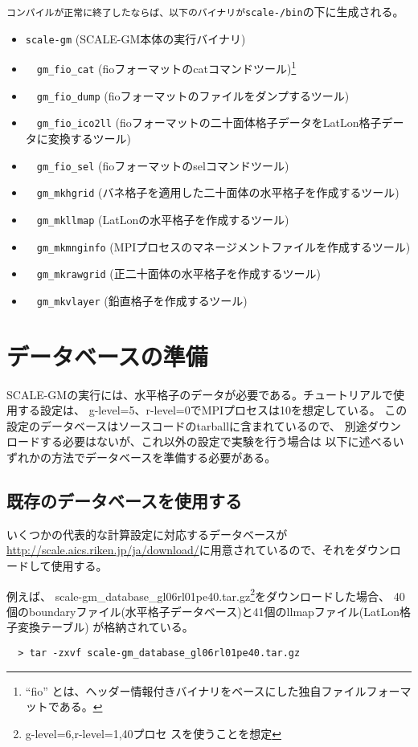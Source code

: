 \verb|コンパイルが正常に終了したならば、以下のバイナリが|\texttt{scale-{\version}/bin}の下に生成される。
 \begin{itemize}
   \item \verb|scale-gm| (SCALE-GM本体の実行バイナリ)
   \item　\verb|gm_fio_cat| (fioフォーマットのcatコマンドツール)\footnote{``fio'' とは、ヘッダー情報付きバイナリをベースにした独自ファイルフォーマットである。}
   \item　\verb|gm_fio_dump| (fioフォーマットのファイルをダンプするツール)
   \item　\verb|gm_fio_ico2ll| (fioフォーマットの二十面体格子データをLatLon格子データに変換するツール)
   \item　\verb|gm_fio_sel| (fioフォーマットのselコマンドツール)
   \item　\verb|gm_mkhgrid| (バネ格子を適用した二十面体の水平格子を作成するツール)
   \item　\verb|gm_mkllmap| (LatLonの水平格子を作成するツール)
   \item　\verb|gm_mkmnginfo| (MPIプロセスのマネージメントファイルを作成するツール)
   \item　\verb|gm_mkrawgrid| (正二十面体の水平格子を作成するツール)
   \item　\verb|gm_mkvlayer| (鉛直格子を作成するツール)
 \end{itemize}


\section{データベースの準備}

SCALE-GMの実行には、水平格子のデータが必要である。チュートリアルで使用する設定は、
g-level=5、r-level=0でMPIプロセスは10を想定している。
この設定のデータベースはソースコードのtarballに含まれているので、
別途ダウンロードする必要はないが、これ以外の設定で実験を行う場合は
以下に述べるいずれかの方法でデータベースを準備する必要がある。
\subsection{既存のデータベースを使用する}
いくつかの代表的な計算設定に対応するデータベースが\noindent \url{http://scale.aics.riken.jp/ja/download/}に用意されているので、それをダウンロードして使用する。

例えば、
scale-gm\_database\_gl06rl01pe40.tar.gz\footnote{g-level=6,r-level=1,40プロセ
  スを使うことを想定}をダウンロードした場合、
40個のboundaryファイル(水平格子データベース)と41個のllmapファイル(LatLon格子変換テーブル)
が格納されている。
\begin{verbatim}
  > tar -zxvf scale-gm_database_gl06rl01pe40.tar.gz
\end{verbatim}

